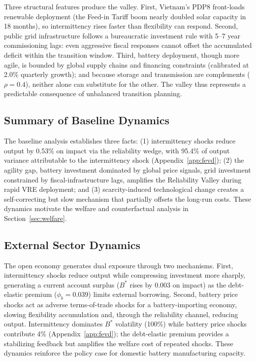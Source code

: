 			Three structural features produce the valley. First, Vietnam's PDP8 front-loads renewable deployment (the Feed-in Tariff boom nearly doubled solar capacity in 18 months), so intermittency rises faster than flexibility can respond. Second, public grid infrastructure follows a bureaucratic investment rule with 5--7 year commissioning lags: even aggressive fiscal responses cannot offset the accumulated deficit within the transition window. Third, battery deployment, though more agile, is bounded by global supply chains and financing constraints (calibrated at 2.0\% quarterly growth); and because storage and transmission are complements ($\rho = 0.4$), neither alone can substitute for the other. The valley thus represents a predictable consequence of unbalanced transition planning.
	
	\subsection{Summary of Baseline Dynamics}
	
	The baseline analysis establishes three facts: (1) intermittency shocks reduce output by 0.53\% on impact via the reliability wedge, with 95.4\% of output variance attributable to the intermittency shock (Appendix~\ref{app:fevd}); (2) the agility gap, battery investment dominated by global price signals, grid investment constrained by fiscal-infrastructure lags, amplifies the Reliability Valley during rapid VRE deployment; and (3) scarcity-induced technological change creates a self-correcting but slow mechanism that partially offsets the long-run costs. These dynamics motivate the welfare and counterfactual analysis in Section~\ref{sec:welfare}.
	
	\subsection{External Sector Dynamics}
	
	The open economy generates dual exposure through two mechanisms. First, intermittency shocks reduce output while compressing investment more sharply, generating a current account surplus ($B^*$ rises by 0.003 on impact) as the debt-elastic premium ($\phi_b = 0.039$) limits external borrowing. Second, battery price shocks act as adverse terms-of-trade shocks for a battery-importing economy, slowing flexibility accumulation and, through the reliability channel, reducing output. Intermittency dominates $B^*$ volatility (100\%) while battery price shocks contribute 4\% (Appendix~\ref{app:fevd}); the debt-elastic premium provides a stabilizing feedback but amplifies the welfare cost of repeated shocks. These dynamics reinforce the policy case for domestic battery manufacturing capacity.
	
